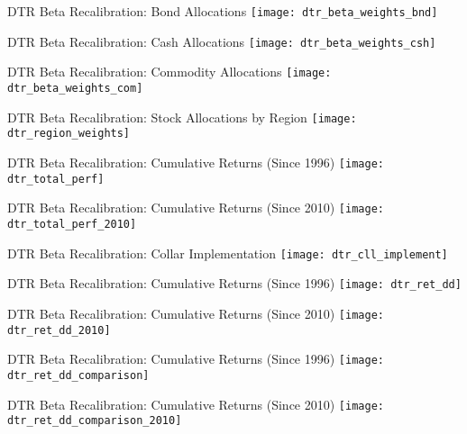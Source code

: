 \documentclass{beamer}
\begin{document}
\begin{frame}{DTR Beta Recalibration: Bond Allocations}
\texttt{[image: dtr\_beta\_weights\_bnd]}
\end{frame}

\begin{frame}{DTR Beta Recalibration: Cash Allocations}
\texttt{[image: dtr\_beta\_weights\_csh]}
\end{frame}

\begin{frame}{DTR Beta Recalibration: Commodity Allocations}
\texttt{[image: dtr\_beta\_weights\_com]}
\end{frame}

\begin{frame}{DTR Beta Recalibration: Stock Allocations by Region}
\texttt{[image: dtr\_region\_weights]}
\end{frame}

\begin{frame}{DTR Beta Recalibration: Cumulative Returns (Since 1996)}
\texttt{[image: dtr\_total\_perf]}
\end{frame}

\begin{frame}{DTR Beta Recalibration: Cumulative Returns (Since 2010)}
\texttt{[image: dtr\_total\_perf\_2010]}
\end{frame}

\begin{frame}{DTR Beta Recalibration: Collar Implementation}
\texttt{[image: dtr\_cll\_implement]}
\end{frame}

\begin{frame}{DTR Beta Recalibration: Cumulative Returns (Since 1996)}
\texttt{[image: dtr\_ret\_dd]}
\end{frame}

\begin{frame}{DTR Beta Recalibration: Cumulative Returns (Since 2010)}
\texttt{[image: dtr\_ret\_dd\_2010]}
\end{frame}

\begin{frame}{DTR Beta Recalibration: Cumulative Returns (Since 1996)}
\texttt{[image: dtr\_ret\_dd\_comparison]}
\end{frame}

\begin{frame}{DTR Beta Recalibration: Cumulative Returns (Since 2010)}
\texttt{[image: dtr\_ret\_dd\_comparison\_2010]}
\end{frame}
\end{document}
